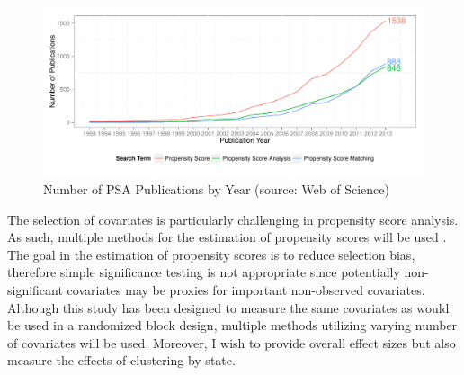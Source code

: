 \documentclass[letterpaper,12p,twoside]{article} %
\begin{document}
\begin{figure}[t]
\begin{center}
\includegraphics[width=.9\textwidth]{../Figures/PSACitations}
\caption[Number of PSA Publications by Year]{Number of PSA Publications by Year (source: Web of Science)}
\label{fig:PSApublications}
\end{center}
\end{figure}

The selection of covariates is particularly challenging in propensity score analysis. As such, multiple methods for the estimation of propensity scores will be used \cite{Rosenbaum2012}. The goal in the estimation of propensity scores is to reduce selection bias, therefore simple significance testing is not appropriate \cite{Rosenbaum2002,Rosenbaum2010} since potentially non-significant covariates may be proxies for important non-observed covariates. Although this study has been designed to measure the same covariates as would be used in a randomized block design, multiple methods utilizing varying number of covariates will be used. Moreover, I wish to provide overall effect sizes but also measure the effects of clustering by state. 
\end{document}
